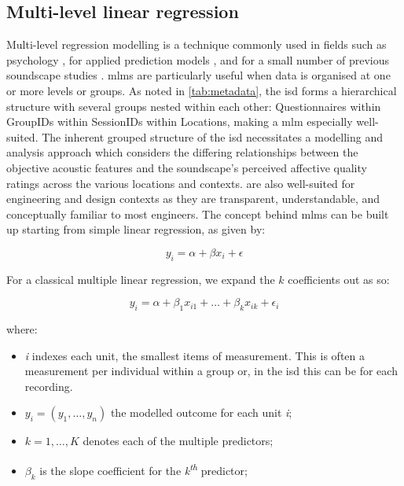 \subsection{Multi-level linear regression}

Multi-level regression modelling is a technique commonly used in fields such as psychology \citep{Quene2004multi,VolpertEsmond2021Using}, for applied prediction models \citep{Gelman2006Multilevel,Frees2006Multilevel}, and for a small number of previous soundscape studies \citep{Aumond2017Modeling}. \glspl{mlm} are particularly useful when data is organised at one or more levels or groups. As noted in \cref{tab:metadata}, the \gls{isd} forms a hierarchical structure with several groups nested within each other: Questionnaires within GroupIDs within SessionIDs within Locations, making a \gls{mlm} especially well-suited. The inherent grouped structure of the \gls{isd} necessitates a modelling and analysis approach which considers the differing relationships between the objective acoustic features and the soundscape's perceived affective quality ratings across the various locations and contexts.  are also well-suited for engineering and design contexts as they are transparent, understandable, and conceptually familiar to most engineers. The concept behind \glspl{mlm} can be built up starting from simple linear regression, as given by:

\begin{equation}
  y_i = \alpha + \beta x_i + \epsilon
\end{equation}

For a classical multiple linear regression, we expand the $k$ coefficients out as so:

\begin{equation}
  \label{eqn:classicRegressModel}
  y_i = \alpha + \beta_1 x_{i1} + \ldots + \beta_k x_{ik} + \epsilon_i
\end{equation}

where:

\begin{itemize}
  \item \emph{i} indexes each unit, the smallest items of measurement. This is often a measurement per individual within a group or, in the \gls{isd} this can be for each recording.
  \item $y_i = (y_1, \ldots, y_n)$ the modelled outcome for each unit \emph{i};
  \item $k = 1, \dots, K$ denotes each of the multiple predictors;
  \item $\beta_k$ is the slope coefficient for the \emph{k\textsuperscript{th}} predictor;
\end{itemize}

